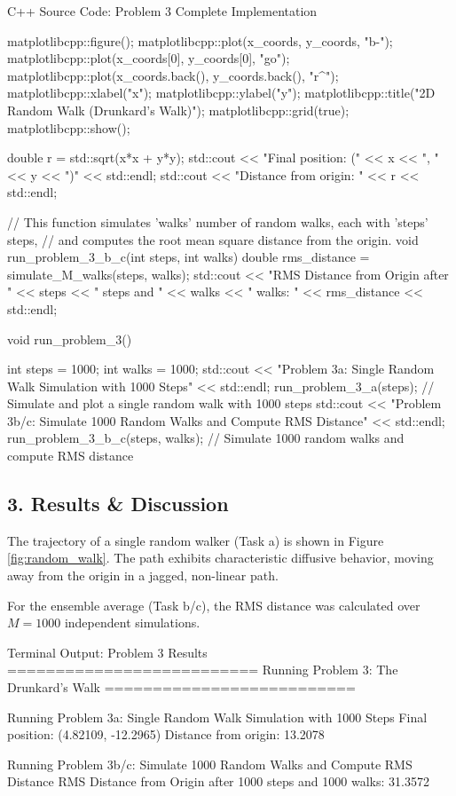\documentclass{article}
\begin{document}
\begin{codebox}{C++ Source Code: Problem 3 Complete Implementation}
{    matplotlibcpp::figure();
    matplotlibcpp::plot(x_coords, y_coords, "b-");
    matplotlibcpp::plot({x_coords[0]}, {y_coords[0]}, "go");
    matplotlibcpp::plot({x_coords.back()}, {y_coords.back()}, "r^"); 
    matplotlibcpp::xlabel("x");
    matplotlibcpp::ylabel("y");
    matplotlibcpp::title("2D Random Walk (Drunkard's Walk)");
    matplotlibcpp::grid(true);
    matplotlibcpp::show();

    double r = std::sqrt(x*x + y*y);
    std::cout << "Final position: (" << x << ", " << y << ")" << std::endl;
    std::cout << "Distance from origin: " << r << std::endl;
}


// This function simulates 'walks' number of random walks, each with 'steps' steps, 
// and computes the root mean square distance from the origin.
void run_problem_3_b_c(int steps, int walks) {
    double rms_distance = simulate_M_walks(steps, walks);
    std::cout << "RMS Distance from Origin after " << steps 
              << " steps and " << walks 
              << " walks: " << rms_distance << std::endl;
}

void run_problem_3() {

    int steps = 1000;
    int walks = 1000;
    std::cout << "\nRunning Problem 3a: Single Random Walk Simulation with 1000 Steps" << std::endl;
    run_problem_3_a(steps); // Simulate and plot a single random walk with 1000 steps
    std::cout << "\nRunning Problem 3b/c: Simulate 1000 Random Walks and Compute RMS Distance" << std::endl;
    run_problem_3_b_c(steps, walks); // Simulate 1000 random walks and compute RMS distance
}
\end{codebox}


\subsection*{3. Results \& Discussion}
The trajectory of a single random walker (Task a) is shown in Figure \ref{fig:random_walk}. The path exhibits characteristic diffusive behavior, moving away from the origin in a jagged, non-linear path.

For the ensemble average (Task b/c), the RMS distance was calculated over $M=1000$ independent simulations.

\begin{outputbox}{Terminal Output: Problem 3 Results}
==========================
Running Problem 3: The Drunkard's Walk
==========================

Running Problem 3a: Single Random Walk Simulation with 1000 Steps
Final position: (4.82109, -12.2965)
Distance from origin: 13.2078

Running Problem 3b/c: Simulate 1000 Random Walks and Compute RMS Distance
RMS Distance from Origin after 1000 steps and 1000 walks: 31.3572
\end{outputbox}
\end{document}

